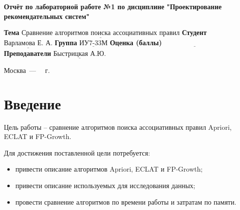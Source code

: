 \documentclass[12pt]{report}
\begin{document}
\begin{titlepage}
	
	\begin{center}
		\noindent\begin{minipage}{1.3\textwidth}\centering
			\Large\textbf{  Отчёт по лабораторной работе №1 по дисциплине}\newline
			\textbf{ "Проектирование рекомендательных систем"}\newline\newline
		\end{minipage}
	\end{center}
	
	\noindent\textbf{Тема} $\underline{\text{Сравнение алгоритмов поиска ассоциативных правил}}$\newline\newline
	\noindent\textbf{Студент} $\underline{\text{Варламова Е. А.}}$\newline\newline
	\noindent\textbf{Группа} $\underline{\text{ИУ7-33М}}$\newline\newline
	\noindent\textbf{Оценка (баллы)} $\underline{\text{~~~~~~~~~~~~~~~~~~~~~~~~~~~}}$\newline\newline
	\noindent\textbf{Преподаватели} $\underline{\text{Быстрицкая А.Ю.}}$\newline\newline\newline
	
	\begin{center}
		\vfill
		Москва~---~\the\year
		~г.
	\end{center}
\end{titlepage}
\large
\setcounter{page}{2}
\def\contentsname{СОДЕРЖАНИЕ}
\renewcommand{\contentsname}{СОДЕРЖАНИЕ}
\tableofcontents
\renewcommand\labelitemi{---}
\newpage
\chapter*{Введение}



Цель работы -- сравнение алгоритмов поиска ассоциативных правил Apriori, ECLAT и FP-Growth.

Для достижения поставленной цели потребуется:
\begin{itemize}
	\item привести описание алгоритмов Apriori, ECLAT и FP-Growth;
	\item привести описание используемых для исследования данных;
	\item провести сравнение алгоритмов по времени работы и затратам по памяти.
\end{itemize}
\end{document}
